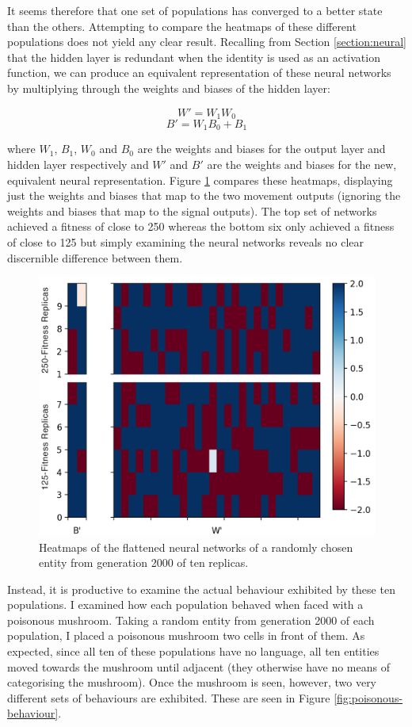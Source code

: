 \documentclass[12pt,a4paper]{report}
\begin{document}
It seems therefore that one set of populations has converged to a better state than the others. Attempting to compare the heatmaps of these different populations does not yield any clear result. Recalling from Section \ref{section:neural} that the hidden layer is redundant when the identity is used as an activation function, we can produce an equivalent representation of these neural networks by multiplying through the weights and biases of the hidden layer:

$$ W' = W_1 W_0 $$
$$ B' = W_1 B_0 + B_1 $$

where $W_1$, $B_1$, $W_0$ and $B_0$ are the weights and biases for the output layer and hidden layer respectively and $W'$ and $B'$ are the weights and biases for the new, equivalent neural representation. Figure \ref{fig:compare} compares these heatmaps, displaying just the weights and biases that map to the two movement outputs (ignoring the weights and biases that map to the signal outputs). The top set of networks achieved a fitness of close to 250 whereas the bottom six only achieved a fitness of close to 125 but simply examining the neural networks reveals no clear discernible difference between them.

\begin{figure}[t]
  \centering
  \includegraphics[width=1.\linewidth]{results/compare2}
  \caption{Heatmaps of the flattened neural networks of a randomly chosen entity from generation 2000 of ten replicas.}
  \label{fig:compare}
\end{figure}

Instead, it is productive to examine the actual behaviour exhibited by these ten populations. I examined how each population behaved when faced with a poisonous mushroom. Taking a random entity from generation 2000 of each population, I placed a poisonous mushroom two cells in front of them. As expected, since all ten of these populations have no language, all ten entities moved towards the mushroom until adjacent (they otherwise have no means of categorising the mushroom). Once the mushroom is seen, however, two very different sets of behaviours are exhibited. These are seen in Figure \ref{fig:poisonous-behaviour}.
\end{document}
